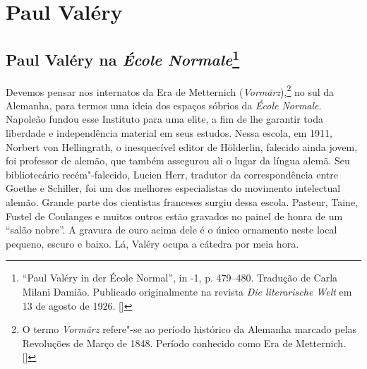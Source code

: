 \part*{Paul Valéry}

\chapter{Paul Valéry na \emph{École Normale}\footnote[*]{``Paul Valéry in der École Normal'', in -1, p. 479--480. Tradução de Carla Milani Damião. Publicado originalmente na revista \emph{Die literarische Welt} em 13 de agosto de 1926. []}}

Devemos pensar nos internatos da Era de Metternich
(\emph{Vormärz}),\footnote{O termo \emph{Vormärz} refere"-se ao período
  histórico da Alemanha marcado pelas Revoluções de Março de 1848.
  Período conhecido como Era de Metternich. []} no sul da
Alemanha, para termos uma ideia dos espaços sóbrios da \emph{École
Normale}. Napoleão fundou esse Instituto para uma elite, a fim de lhe
garantir toda liberdade e independência material em seus estudos. Nessa
escola, em 1911, Norbert von Hellingrath, o inesquecível editor de
Hölderlin, falecido ainda jovem, foi professor de alemão, que também
assegurou ali o lugar da língua alemã. Seu bibliotecário recém"-falecido,
Lucien Herr, tradutor da correspondência entre Goethe e Schiller, foi um
dos melhores especialistas do movimento intelectual alemão. Grande parte
dos cientistas franceses surgiu dessa escola. Pasteur, Taine, Fustel de
Coulanges e muitos outros estão gravados no painel de honra de um
``salão nobre''. A gravura de ouro acima dele é o único ornamento neste local
pequeno, escuro e baixo. Lá, Valéry ocupa a cátedra por meia
hora.

